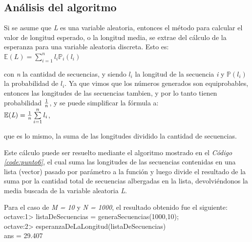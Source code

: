 \documentclass{article}
\newcommand{\refcode}[1]{\textit{Código \ref{#1}}}
\begin{document}

\bigskip

\subsection{Análisis del algoritmo}

	Si se asume que \textit{L} es una variable aleatoria, entonces el método para calcular el valor de longitud esperado, o la longitud media, se extrae del cálculo de la esperanza para una variable aleatoria discreta. Esto es:\\
	 
$\mathbb{E}(\textit{L}) = \sum\limits_{i=1}^n l_{i} \mathbb{P}_{i}(l_{i}) $

\bigskip
\noindent con \textit{n} la cantidad de secuencias, y siendo \textit{$l_i$} la longitud de la secuencia \textit{i} y \textit{$\mathbb{P}(l_i)$} la probabilidad de \textit{$l_i$}. Ya que vimos que los números generados son equiprobables, entonces las longitudes de las secuencias tambien, y por lo tanto tienen probabilidad $1 \over n$, y se puede simplificar la fórmula a:\\

\indent $\mathbb{E}(\textit{L}) = {1 \over n} \sum\limits_{i=1}^n l_{i} $,

\bigskip
\noindent que es lo mismo, la suma de las longitudes dividido la cantidad de secuencias. 
	\par
	Este cálculo puede ser resuelto mediante el algoritmo mostrado en el \refcode{code:punto6}, el cual suma las longitudes de las secuencias contenidas en una lista (vector) pasado por parámetro a la función y luego divide el resultado de la suma por la cantidad total de secuencias albergadas en la lista, devolviéndonos la media buscada de la variable aleatoria \textit{L}.\medskip


\bigskip

\bigskip 
\noindent Para el caso de \textit{M = 10} y \textit{N = 1000}, el resultado obtenido fue el siguiente:\\

{\ttfamily\footnotesize
\indent octave:1> listaDeSecuencias = generaSecuencias(1000,10);\\
\indent octave:2> esperanzaDeLaLongitud(listaDeSecuencias)\\
\indent ans =  29.407}
\end{document}
